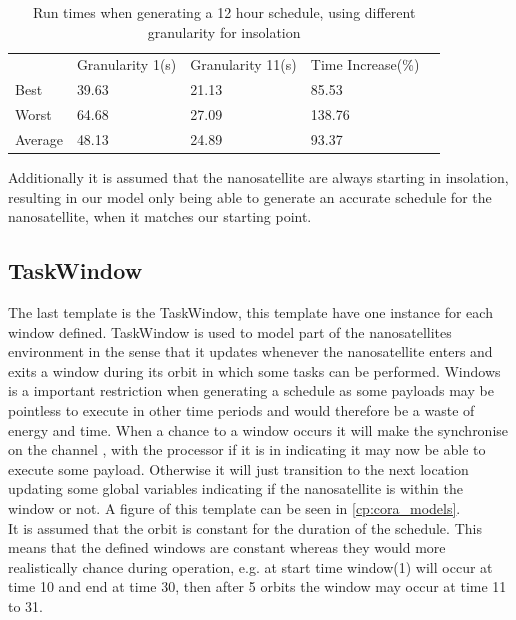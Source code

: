 \begin{table}[H]
	\centering
	\begin{tabular}{lllll}
		& Granularity 1(s)           & Granularity 11(s)          & Time Increase(\%)           &  \\ \cline{2-4}
		\multicolumn{1}{l|}{Best}    & \multicolumn{1}{l|}{39.63} & \multicolumn{1}{l|}{21.13} & \multicolumn{1}{l|}{85.53}  &  \\
		\multicolumn{1}{l|}{Worst}   & \multicolumn{1}{l|}{64.68} & \multicolumn{1}{l|}{27.09} & \multicolumn{1}{l|}{138.76} &  \\
		\multicolumn{1}{l|}{Average} & \multicolumn{1}{l|}{48.13} & \multicolumn{1}{l|}{24.89} & \multicolumn{1}{l|}{93.37}  &  \\ \cline{2-4}
	\end{tabular}
		\caption{Run times when generating a 12 hour schedule, using different granularity for insolation}
		\label{tab:runTimes}
\end{table}
		
Additionally it is assumed that the nanosatellite are always starting in insolation, resulting in our model only being able to generate an accurate schedule for the nanosatellite, when it matches our starting point.


\subsection*{TaskWindow}\label{ssec:cora_tw}
The last template is the TaskWindow, this template have one instance for each window defined. TaskWindow is used to model part of the nanosatellites environment in the sense that it updates whenever the nanosatellite enters and exits a window during its orbit in which some tasks can be performed. Windows is a important restriction when generating a schedule as some payloads may be pointless to execute in other time periods and would therefore be a waste of energy and time. When a chance to a window occurs it will make the synchronise on the channel , with the processor if it is in  indicating it may now be able to execute some payload. Otherwise it will just transition to the next location updating some global variables indicating if the nanosatellite is within the window or not. 
A figure of this template can be seen in \cref{cp:cora_models}.\\
It is assumed that the orbit is constant for the duration of the schedule. This means that the defined windows are constant whereas they would more realistically chance during operation, e.g. at start time window(1) will occur at time 10 and end at time 30, then after 5 orbits the window may occur at time 11 to 31.


